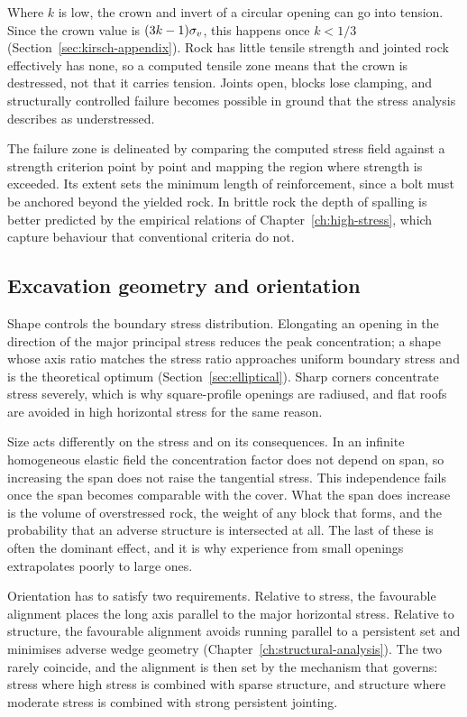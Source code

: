 Where $k$ is low, the crown and invert of a circular opening can go into
tension. Since the crown value is $(3k-1)\sigma_v$, this happens once $k < 1/3$
(Section~\ref{sec:kirsch-appendix}). Rock has little tensile strength
and jointed rock effectively has none, so a
computed tensile zone means that the crown is destressed, not that it
carries tension. Joints open, blocks lose clamping, and structurally
controlled failure becomes possible in ground that the stress analysis
describes as understressed.

The failure zone is delineated by comparing the computed stress field
against a strength criterion point by point and mapping the region where
strength is exceeded. Its extent sets the
minimum length of reinforcement, since a bolt must be anchored beyond the
yielded rock. In brittle rock the depth of
spalling is better predicted by the empirical relations of
Chapter~\ref{ch:high-stress}, which capture behaviour that conventional criteria
do not.

\subsection{Excavation geometry and orientation}
\label{sec:geometry-orientation}

Shape controls the boundary stress distribution. Elongating an opening in the
direction of the major principal stress reduces the peak concentration; a
shape whose axis ratio matches the stress ratio approaches uniform boundary
stress and is the theoretical optimum (Section~\ref{sec:elliptical}). Sharp corners concentrate stress
severely, which is why square-profile openings are radiused, and flat roofs
are avoided in high horizontal stress for the same reason.

Size acts differently on the stress and on its consequences. In an infinite homogeneous elastic field
the concentration factor does not depend on span, so increasing the span does
not raise the tangential stress. This independence fails once the span
becomes comparable with the cover. What the span does increase is the volume of overstressed rock, the
weight of any block that forms, and the probability that an adverse structure
is intersected at all. The last of these is often the dominant effect, and it
is why experience from small openings extrapolates poorly to large ones.

Orientation has to satisfy two requirements. Relative to stress, the favourable
alignment places the long axis parallel to the major horizontal stress.
Relative to structure, the favourable alignment avoids running parallel to a
persistent set and minimises adverse wedge geometry
(Chapter~\ref{ch:structural-analysis}). The two rarely coincide, and the
alignment is then set by the mechanism that governs: stress where high stress
is combined with sparse structure, and structure where moderate stress is
combined with strong persistent jointing.

